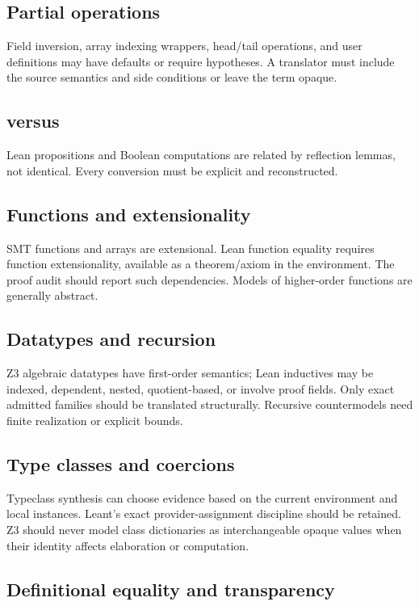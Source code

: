 \documentclass[11pt,letterpaper,openany]{report}
\newcommand{\code}[1]{\texttt{\detokenize{#1}}}
\begin{document}
\subsection{Partial operations}

Field inversion, array indexing wrappers, head/tail operations, and user definitions
may have defaults or require hypotheses. A translator must include the source semantics
and side conditions or leave the term opaque.

\subsection{\code{Prop} versus \code{Bool}}

Lean propositions and Boolean computations are related by reflection lemmas, not
identical. Every conversion must be explicit and reconstructed.

\subsection{Functions and extensionality}

SMT functions and arrays are extensional. Lean function equality requires function
extensionality, available as a theorem/axiom in the environment. The proof audit should
report such dependencies. Models of higher-order functions are generally abstract.

\subsection{Datatypes and recursion}

Z3 algebraic datatypes have first-order semantics; Lean inductives may be indexed,
dependent, nested, quotient-based, or involve proof fields. Only exact admitted
families should be translated structurally. Recursive countermodels need finite
realization or explicit bounds.

\subsection{Type classes and coercions}

Typeclass synthesis can choose evidence based on the current environment and local
instances. Leant's exact provider-assignment discipline should be retained. Z3 should
never model class dictionaries as interchangeable opaque values when their identity
affects elaboration or computation.

\subsection{Definitional equality and transparency}
\end{document}
